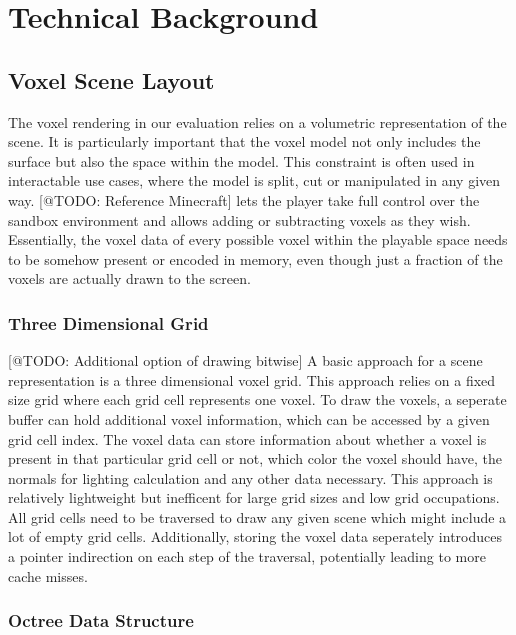 \chapter{Technical Background} \label{cpt-technical-background}

\section{Voxel Scene Layout}

The voxel rendering in our evaluation relies on a volumetric representation of the scene.
It is particularly important that the voxel model not only includes the surface but also 
the space within the model. This constraint is often used in interactable use cases, where 
the model is split, cut or manipulated in any given way. [@TODO: Reference Minecraft] lets
the player take full control over the sandbox environment and allows adding or subtracting 
voxels as they wish. Essentially, the voxel data of every possible voxel within the playable 
space needs to be somehow present or encoded in memory, even though just a fraction of the 
voxels are actually drawn to the screen.\\

\subsection{Three Dimensional Grid} \label{subsec-three-dimensional-grid}

[@TODO: Additional option of drawing bitwise]
A basic approach for a scene representation is a three dimensional voxel grid. This 
approach relies on a fixed size grid where each grid cell represents one voxel.
To draw the voxels, a seperate buffer can hold additional voxel information, which 
can be accessed by a given grid cell index. The voxel data can store information about 
whether a voxel is present in that particular grid cell or not, which color the voxel 
should have, the normals for lighting calculation and any other data necessary.
This approach is relatively lightweight but inefficent for large grid sizes and low 
grid occupations. All grid cells need to be traversed to draw any given scene which 
might include a lot of empty grid cells. Additionally, storing the voxel data seperately
introduces a pointer indirection on each step of the traversal, potentially leading to more 
cache misses.

\subsection{Octree Data Structure} \label{subsec-octree-data-structure}

